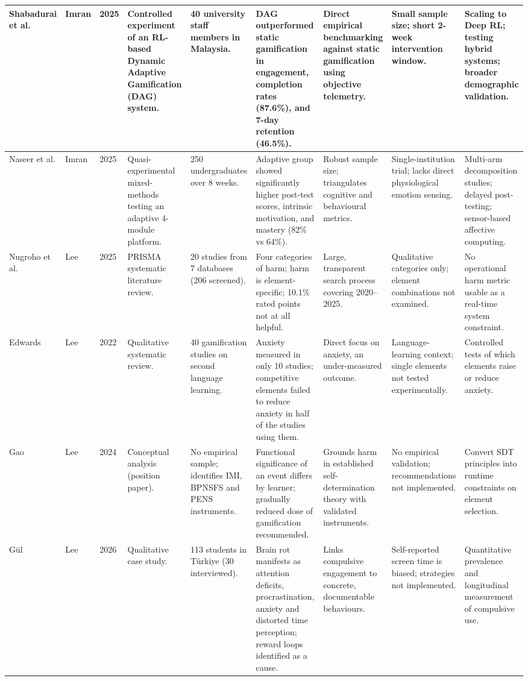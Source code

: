 \documentclass[12pt,a4paper]{article}
\begin{document}
\begin{longtable}{|
L{1.5cm}|
L{1.1cm}|
C{0.7cm}|
L{1.7cm}|
L{1.7cm}|
L{2.2cm}|
L{1.7cm}|
L{1.7cm}|
L{1.9cm}|}
Shabadurai et al. &
Imran &
2025 &
Controlled experiment of an RL-based Dynamic Adaptive Gamification (DAG) system. &
40 university staff members in Malaysia. &
DAG outperformed static gamification in engagement, completion rates (87.6\%), and 7-day retention (46.5\%). &
Direct empirical benchmarking against static gamification using objective telemetry. &
Small sample size; short 2-week intervention window. &
Scaling to Deep RL; testing hybrid systems; broader demographic validation.
\tabularnewline
\hline


Naseer et al. &
Imran &
2025 &
Quasi-experimental mixed-methods testing an adaptive 4-module platform. &
250 undergraduates over 8 weeks. &
Adaptive group showed significantly higher post-test scores, intrinsic motivation, and mastery (82\% vs 64\%). &
Robust sample size; triangulates cognitive and behavioural metrics. &
Single-institution trial; lacks direct physiological emotion sensing. &
Multi-arm decomposition studies; delayed post-testing; sensor-based affective computing.
\tabularnewline
\hline


Nugroho et al. &
Lee &
2025 &
PRISMA systematic literature review. &
20 studies from 7 databases (206 screened). &
Four categories of harm; harm is element-specific; 10.1\% rated points not at all helpful. &
Large, transparent search process covering 2020--2025. &
Qualitative categories only; element combinations not examined. &
No operational harm metric usable as a real-time system constraint.
\tabularnewline
\hline


Edwards &
Lee &
2022 &
Qualitative systematic review. &
40 gamification studies on second language learning. &
Anxiety measured in only 10 studies; competitive elements failed to reduce anxiety in half of the studies using them. &
Direct focus on anxiety, an under-measured outcome. &
Language-learning context; single elements not tested experimentally. &
Controlled tests of which elements raise or reduce anxiety.
\tabularnewline
\hline


Gao &
Lee &
2024 &
Conceptual analysis (position paper). &
No empirical sample; identifies IMI, BPNSFS and PENS instruments. &
Functional significance of an event differs by learner; gradually reduced dose of gamification recommended. &
Grounds harm in established self-determination theory with validated instruments. &
No empirical validation; recommendations not implemented. &
Convert SDT principles into runtime constraints on element selection.
\tabularnewline
\hline


G\"{u}l &
Lee &
2026 &
Qualitative case study. &
113 students in T\"{u}rkiye (30 interviewed). &
Brain rot manifests as attention deficits, procrastination, anxiety and distorted time perception; reward loops identified as a cause. &
Links compulsive engagement to concrete, documentable behaviours. &
Self-reported screen time is biased; strategies not implemented. &
Quantitative prevalence and longitudinal measurement of compulsive use.
\tabularnewline
\hline



\end{longtable}
\end{document}
